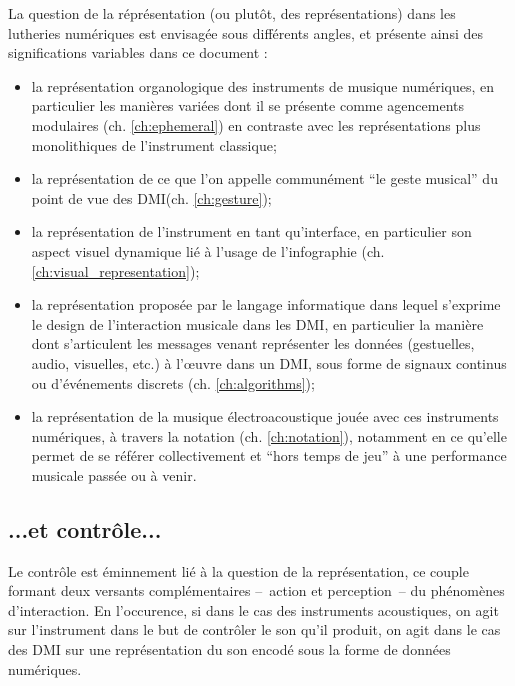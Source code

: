 La question de la réprésentation (ou plutôt, des représentations) dans les lutheries numériques est envisagée sous différents angles, et présente ainsi des significations variables dans ce document : 
\vspace{-1em}
\begin{itemize}[noitemsep]
\item la représentation organologique des instruments de musique numériques, en particulier les manières variées dont il se présente comme agencements modulaires (ch. \ref{ch:ephemeral}) en contraste avec les représentations plus monolithiques de l'instrument classique;
\item la représentation de ce que l'on appelle communément ``le geste musical'' du point de vue des \gls{DMI}(ch. \ref{ch:gesture});
\item la représentation de l'instrument en tant qu'interface, en particulier son aspect visuel dynamique lié à l'usage de l'infographie (ch. \ref{ch:visual_representation});
\item la représentation proposée par le langage informatique dans lequel s'exprime le design de l'interaction musicale dans les \gls{DMI}, en particulier la manière dont s'articulent les messages venant représenter les données (gestuelles, audio, visuelles, etc.) à l'œuvre dans un DMI, sous forme de signaux continus ou d'événements discrets (ch. \ref{ch:algorithms});
\item la représentation de la musique électroacoustique jouée avec ces instruments numériques, à travers la notation (ch. \ref{ch:notation}), notamment en ce qu'elle permet de se référer collectivement et ``hors temps de jeu'' à une performance musicale passée ou à venir.
\end{itemize}


\subsection*{...et contrôle...}

Le contrôle est éminnement lié à la question de la représentation, ce couple formant deux versants complémentaires --~action et perception~-- du phénomènes d'interaction. En l'occurence, si dans le cas des instruments acoustiques, on agit sur l'instrument dans le but de contrôler le son qu'il produit, on agit dans le cas des \gls{DMI} sur une représentation du son encodé sous la forme de données numériques.

